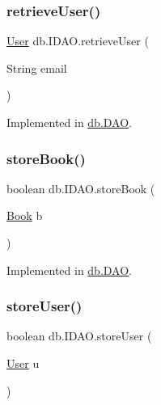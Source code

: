 \subsubsection{\texorpdfstring{retrieve\+User()}{retrieveUser()}}
{\footnotesize\ttfamily \hyperlink{classserver_1_1data_1_1_user}{User} db.\+I\+D\+A\+O.\+retrieve\+User (\begin{DoxyParamCaption}\item[{String}]{email }\end{DoxyParamCaption})}



Implemented in \hyperlink{classdb_1_1_d_a_o_a6da084ffd9b0da23acba9dc68e747303}{db.\+D\+AO}.

\mbox{\label{interfacedb_1_1_i_d_a_o_a39851dc1e1f05af40afeb76a5f8be99a}} 
\subsubsection{\texorpdfstring{store\+Book()}{storeBook()}}
{\footnotesize\ttfamily boolean db.\+I\+D\+A\+O.\+store\+Book (\begin{DoxyParamCaption}\item[{\hyperlink{classserver_1_1data_1_1_book}{Book}}]{b }\end{DoxyParamCaption})}



Implemented in \hyperlink{classdb_1_1_d_a_o_a036246b8124d7ac8a36e3eaafd3eb81a}{db.\+D\+AO}.

\mbox{\label{interfacedb_1_1_i_d_a_o_a5b1f408c9a25305e977e962faa38b026}} 
\subsubsection{\texorpdfstring{store\+User()}{storeUser()}}
{\footnotesize\ttfamily boolean db.\+I\+D\+A\+O.\+store\+User (\begin{DoxyParamCaption}\item[{\hyperlink{classserver_1_1data_1_1_user}{User}}]{u }\end{DoxyParamCaption})}



